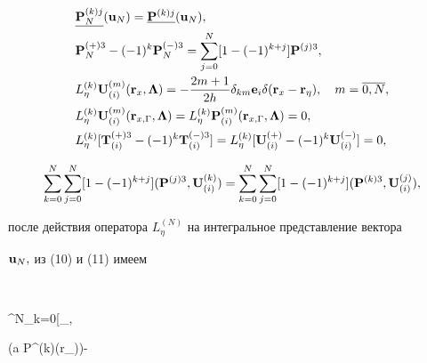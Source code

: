 \begin{align} 


&\underline{{\bold P}^{(k)j}_N}({\bold u}_N)=


\underline{{\bold P}^{(k)j}}({\bold u}_N),\notag\\ 


%


& {\bold P}^{(+)3}_N-(-1)^k{\bold P}^{(-)3}_N=\sum^N_{j=0} 


[1-(-1)^{k+j}]{\bold P}^{(j)3},\\ 


%


& L^{(k)}_\eta{\bold U}^{(m)}_{(i)}({\bold r}_x,{\boldsymbol \Lambda}) 


=-\frac{2m+1}{2h}\delta_{km}{\bold e}_i\delta({\bold r}_x-{\bold r}_\eta), 


\quad m=\overline{0,N},\notag\\ 


%


& L^{(k)}_\eta{\bold U}^{(m)}_{(i)}({\bold r}_{x,\Gamma},{\boldsymbol \Lambda}) 


=L^{(k)}_\eta{\bold P}^{(m)}_{(i)}({\bold r}_{x,\Gamma},{\boldsymbol \Lambda})=0, 


\notag\\ 


%


& L^{(k)}_\eta[{\bold T}^{(+)3}_{(i)}-(-1)^k 


{\bold T}^{(-)3}_{(i)}]= 


L^{(k)}_\eta[{\bold U}^{(+)}_{(i)}-(-1)^k 


{\bold U}^{(-)}_{(i)}]=0,\notag 


\end{align} 


$$


\sum^N_{k=0}\sum^N_{j=0}[1-(-1)^{k+j}]({\bold P}^{(j)3}, 


{\bold U}^{(k)}_{(i)})= 


\sum^N_{k=0}\sum^N_{j=0}[1-(-1)^{k+j}]({\bold P}^{(k)3}, 


{\bold U}^{(j)}_{(i)}),


$$


после действия оператора $L^{(N)}_\eta$ на интегральное представление вектора 


${\bold u}_N,$ из (10) и (11) имеем 


$$ 


\sum^N_{k=0}\left[\partial_{\alpha,\eta} 


(\sqrt a {\bold P}^{(k)\alpha}({\bold r}_\eta))- 


